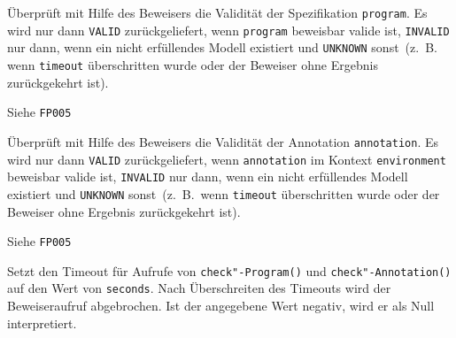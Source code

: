 
\begin{description}%



    Überprüft mit Hilfe des Beweisers die Validität der Spezifikation
    \texttt{program}. Es wird nur dann \texttt{VALID} zurückgeliefert,
    wenn \texttt{program} beweisbar valide ist, \texttt{INVALID} nur
    dann, wenn ein nicht erfüllendes Modell existiert und
    \texttt{UNKNOWN} sonst~(z.~B.\, wenn \texttt{timeout}
    überschritten wurde oder der Beweiser ohne Ergebnis zurückgekehrt
    ist).%


    Siehe \texttt{FP005}%


    Überprüft mit Hilfe des Beweisers die Validität der Annotation
    \texttt{annotation}. Es wird nur dann \texttt{VALID}
    zurückgeliefert, wenn \texttt{annotation} im Kontext
    \texttt{environment} beweisbar valide ist, \texttt{INVALID} nur
    dann, wenn ein nicht erfüllendes Modell existiert und
    \texttt{UNKNOWN} sonst~(z.~B.\, wenn \texttt{timeout}
    überschritten wurde oder der Beweiser ohne Ergebnis zurückgekehrt
    ist).%


    Siehe \texttt{FP005}%



    Setzt den Timeout für Aufrufe von \texttt{check"-Program()} und
    \texttt{check"-Annotation()} auf den Wert von \texttt{seconds}.
    Nach Überschreiten des Timeouts wird der Beweiseraufruf
    abgebrochen. Ist der angegebene Wert negativ, wird er als Null
    interpretiert.%

\end{description}%

